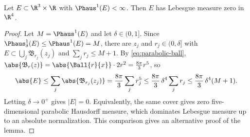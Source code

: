 \documentclass[11pt,reqno]{amsart}
\begin{document}
\begin{lemma}\label{lem:P1-implies-null}
Let $E\subset\R^{3}\times\R$ with $\Phaus^{1}(E)<\infty$. Then $E$ has Lebesgue
measure zero in $\R^{4}$.
\end{lemma}

\begin{proof}
Let $M=\Phaus^{1}(E)$ and let $\delta\in(0,1]$. Since
$\Phaus^{1}_{\delta}(E)\le\Phaus^{1}(E)=M$, there are $z_{j}$ and
$r_{j}\in(0,\delta]$ with $E\subset\bigcup_{j}\mathfrak{B}_{r_{j}}(z_{j})$ and
$\sum_{j}r_{j}\le M+1$. By \eqref{eq:parabolic-ball},
$\abs{\mathfrak{B}_{r}(z)}=\abs{\Ball{r}{x}}\cdot2r^{2}=\tfrac{8\pi}{3}r^{5}$,
so
\[
  \abs{E}\le\sum_{j}\abs{\mathfrak{B}_{r_{j}}(z_{j})}
  =\frac{8\pi}{3}\sum_{j}r_{j}^{5}
  \le\frac{8\pi}{3}\,\delta^{4}\sum_{j}r_{j}
  \le\frac{8\pi}{3}\,\delta^{4}(M+1).
\]
Letting $\delta\to0^{+}$ gives $|E|=0$.
Equivalently, the same cover gives zero five-dimensional parabolic
Hausdorff measure, which dominates Lebesgue measure up to an absolute
normalization. This comparison gives an alternative proof of the lemma.
\end{proof}
\end{document}
